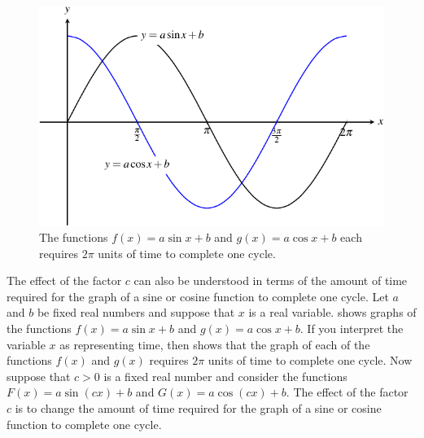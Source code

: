 \documentclass[a4paper,oneside,12pt]{article}
\begin{document}
\begin{figure}[!htbp]
\centering
\includegraphics[scale=1.1]{image/13/sin-cos-cycle-default.pdf}
\caption{%
  The functions $f(x) = a \sin x + b$ and $g(x) = a \cos x + b$ each
  requires $2\pi$ units of time to complete one cycle.
}
\label{fig:trigonometric:sine_cosine_one_cycle}
\end{figure}

The effect of the factor $c$ can also be understood in terms of the
amount of time required for the graph of a sine or cosine function to
complete one cycle.  Let $a$ and $b$ be fixed real numbers and suppose
that $x$ is a real variable.
 shows graphs of the
functions $f(x) = a \sin x + b$ and $g(x) = a \cos x + b$.  If you
interpret the variable $x$ as representing time, then
 shows that the graph
of each of the functions $f(x)$ and $g(x)$ requires $2\pi$ units of
time to complete one cycle.  Now suppose that $c > 0$ is a fixed real
number and consider the functions $F(x) = a \sin(cx) + b$ and
$G(x) = a \cos(cx) + b$.  The effect of the factor $c$ is to change
the amount of time required for the graph of a sine or cosine function
to complete one cycle.
\end{document}
